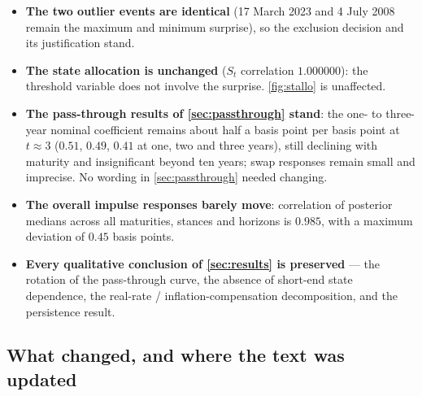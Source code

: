 {\begin{itemize}
\item \textbf{The two outlier events are identical} (17 March 2023 and 4 July 2008 remain the
      maximum and minimum surprise), so the exclusion decision and its justification stand.
\item \textbf{The state allocation is unchanged} ($S_t$ correlation $1.000000$): the threshold
      variable does not involve the surprise. \autoref{fig:stallo} is unaffected.
\item \textbf{The pass-through results of \autoref{sec:passthrough} stand}: the one- to three-year
      nominal coefficient remains about half a basis point per basis point at $t\approx 3$
      ($0.51$, $0.49$, $0.41$ at one, two and three years), still declining with maturity and
      insignificant beyond ten years; swap responses remain small and imprecise. No wording in
      \autoref{sec:passthrough} needed changing.
\item \textbf{The overall impulse responses barely move}: correlation of posterior medians across
      all maturities, stances and horizons is $0.985$, with a maximum deviation of $0.45$ basis
      points.
\item \textbf{Every qualitative conclusion of \autoref{sec:results} is preserved} --- the rotation
      of the pass-through curve, the absence of short-end state dependence, the real-rate /
      inflation-compensation decomposition, and the persistence result.
\end{itemize}

\subsection*{What changed, and where the text was updated}

}
